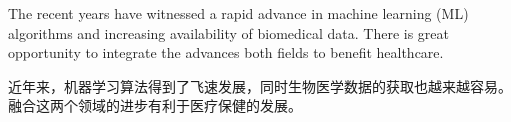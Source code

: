 
The recent years have witnessed a rapid advance in machine learning (ML) algorithms and increasing availability of biomedical data. There is great opportunity to integrate the advances both fields to benefit healthcare. 

\newpage
\begin{CJK*}{UTF8}{gbsn}
  近年来，机器学习算法得到了飞速发展，同时生物医学数据的获取也越来越容易。融合这两个领域的进步有利于医疗保健的发展。
\clearpage\end{CJK*}


